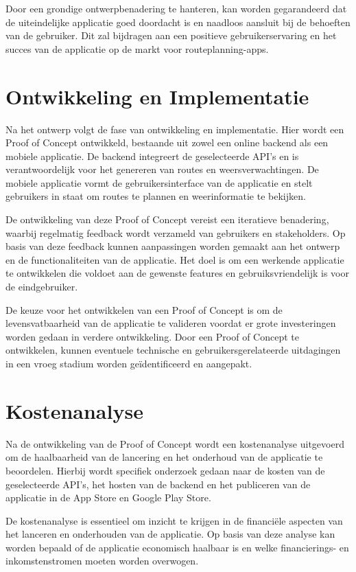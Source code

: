 Door een grondige ontwerpbenadering te hanteren, kan worden gegarandeerd dat de uiteindelijke applicatie goed doordacht is en naadloos aansluit bij de behoeften van de gebruiker. 
Dit zal bijdragen aan een positieve gebruikerservaring en het succes van de applicatie op de markt voor routeplanning-apps.

\section{Ontwikkeling en Implementatie}

Na het ontwerp volgt de fase van ontwikkeling en implementatie. Hier wordt een Proof of Concept ontwikkeld, bestaande uit zowel een online backend als een mobiele applicatie. 
De backend integreert de geselecteerde API's en is verantwoordelijk voor het genereren van routes en weersverwachtingen. 
De mobiele applicatie vormt de gebruikersinterface van de applicatie en stelt gebruikers in staat om routes te plannen en weerinformatie te bekijken.

De ontwikkeling van deze Proof of Concept vereist een iteratieve benadering, waarbij regelmatig feedback wordt verzameld van gebruikers en stakeholders. 
Op basis van deze feedback kunnen aanpassingen worden gemaakt aan het ontwerp en de functionaliteiten van de applicatie. 
Het doel is om een werkende applicatie te ontwikkelen die voldoet aan de gewenste features en gebruiksvriendelijk is voor de eindgebruiker.

De keuze voor het ontwikkelen van een Proof of Concept is om de levensvatbaarheid van de applicatie te valideren voordat er grote investeringen worden gedaan in verdere ontwikkeling. 
Door een Proof of Concept te ontwikkelen, kunnen eventuele technische en gebruikersgerelateerde uitdagingen in een vroeg stadium worden geïdentificeerd en aangepakt.

\section{Kostenanalyse}

Na de ontwikkeling van de Proof of Concept wordt een kostenanalyse uitgevoerd om de haalbaarheid van de lancering en het onderhoud van de applicatie te beoordelen. 
Hierbij wordt specifiek onderzoek gedaan naar de kosten van de geselecteerde API's, het hosten van de backend en het publiceren van de applicatie in de App Store en Google Play Store.

De kostenanalyse is essentieel om inzicht te krijgen in de financiële aspecten van het lanceren en onderhouden van de applicatie. 
Op basis van deze analyse kan worden bepaald of de applicatie economisch haalbaar is en welke financierings- en inkomstenstromen moeten worden overwogen.

